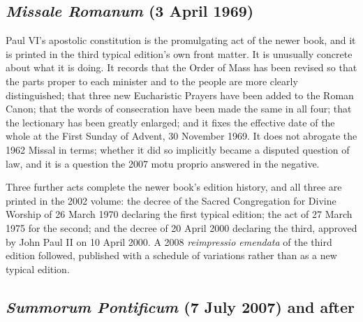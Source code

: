 \subsection{\emph{Missale Romanum} (3 April 1969)}

Paul VI's apostolic constitution is the promulgating act of the newer book, and it is printed in the third typical edition's own front matter. It is unusually concrete about what it is doing. It records that the Order of Mass has been revised so that the parts proper to each minister and to the people are more clearly distinguished; that three new Eucharistic Prayers have been added to the Roman Canon; that the words of consecration have been made the same in all four; that the lectionary has been greatly enlarged; and it fixes the effective date of the whole at the First Sunday of Advent, 30 November 1969. It does not abrogate the 1962 Missal in terms; whether it did so implicitly became a disputed question of law, and it is a question the 2007 motu proprio answered in the negative.

Three further acts complete the newer book's edition history, and all three are printed in the 2002 volume: the decree of the Sacred Congregation for Divine Worship of 26 March 1970 declaring the first typical edition; the act of 27 March 1975 for the second; and the decree of 20 April 2000 declaring the third, approved by John Paul II on 10 April 2000. A 2008 \emph{reimpressio emendata} of the third edition followed, published with a schedule of variations rather than as a new typical edition.

\subsection{\emph{Summorum Pontificum} (7 July 2007) and after}

